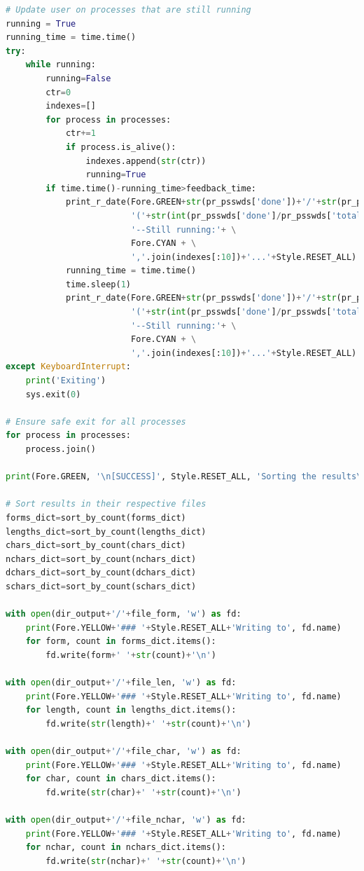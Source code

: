 \documentclass[a4paper,12pt]{article}
\begin{document}
\begin{lstlisting}[language=Python]
# Update user on processes that are still running
running = True
running_time = time.time()
try:
    while running:
        running=False
        ctr=0
        indexes=[]
        for process in processes:
            ctr+=1
            if process.is_alive():
                indexes.append(str(ctr))
                running=True
        if time.time()-running_time>feedback_time:
            print_r_date(Fore.GREEN+str(pr_psswds['done'])+'/'+str(pr_psswds['total'])+Fore.YELLOW+ \
                         '('+str(int(pr_psswds['done']/pr_psswds['total']*100))+'%)'+ \
                         '--Still running:'+ \
                         Fore.CYAN + \
                         ','.join(indexes[:10])+'...'+Style.RESET_ALL)
            running_time = time.time()
            time.sleep(1)
            print_r_date(Fore.GREEN+str(pr_psswds['done'])+'/'+str(pr_psswds['total'])+Fore.YELLOW+ \
                         '('+str(int(pr_psswds['done']/pr_psswds['total']*100))+'%)'+ \
                         '--Still running:'+ \
                         Fore.CYAN + \
                         ','.join(indexes[:10])+'...'+Style.RESET_ALL)
except KeyboardInterrupt:
    print('Exiting')
    sys.exit(0)
        
# Ensure safe exit for all processes
for process in processes:
    process.join()

print(Fore.GREEN, '\n[SUCCESS]', Style.RESET_ALL, 'Sorting the results\n')

# Sort results in their respective files
forms_dict=sort_by_count(forms_dict)
lengths_dict=sort_by_count(lengths_dict)
chars_dict=sort_by_count(chars_dict)
nchars_dict=sort_by_count(nchars_dict)
dchars_dict=sort_by_count(dchars_dict)
schars_dict=sort_by_count(schars_dict)

with open(dir_output+'/'+file_form, 'w') as fd:
    print(Fore.YELLOW+'### '+Style.RESET_ALL+'Writing to', fd.name)
    for form, count in forms_dict.items():
        fd.write(form+' '+str(count)+'\n')

with open(dir_output+'/'+file_len, 'w') as fd:
    print(Fore.YELLOW+'### '+Style.RESET_ALL+'Writing to', fd.name)
    for length, count in lengths_dict.items():
        fd.write(str(length)+' '+str(count)+'\n')

with open(dir_output+'/'+file_char, 'w') as fd:
    print(Fore.YELLOW+'### '+Style.RESET_ALL+'Writing to', fd.name)
    for char, count in chars_dict.items():
        fd.write(str(char)+' '+str(count)+'\n')

with open(dir_output+'/'+file_nchar, 'w') as fd:
    print(Fore.YELLOW+'### '+Style.RESET_ALL+'Writing to', fd.name)
    for nchar, count in nchars_dict.items():
        fd.write(str(nchar)+' '+str(count)+'\n')


\end{lstlisting}
\end{document}
